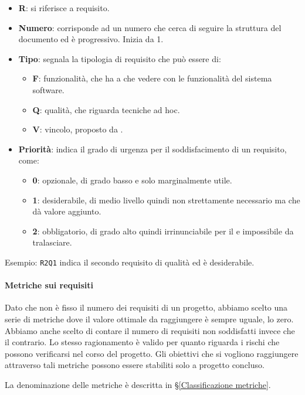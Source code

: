 		\begin{itemize}
			\item \textbf{R}: si riferisce a requisito.
		 	\item \textbf{Numero}: corrisponde ad un numero che cerca di seguire la struttura del documento ed è progressivo. Inizia da 1.
		 	\item \textbf{Tipo}: segnala la tipologia di requisito che può essere di:
		 	\begin{itemize}
		 		\item \textbf{F}: funzionalità, che ha a che vedere con le funzionalità del sistema software.
		 		\item \textbf{Q}: qualità, che riguarda tecniche ad hoc.
		 		\item \textbf{V}: vincolo, proposto da \II.
		 	\end{itemize}
	 		\item \textbf{Priorità}: indica il grado di urgenza per il soddisfacimento di un requisito, come:
	 		\begin{itemize}
	 			\item \textbf{0}: opzionale, di grado basso e solo marginalmente utile.
	 			\item \textbf{1}: desiderabile, di medio livello quindi non strettamente necessario ma che dà valore aggiunto.
	 			\item \textbf{2}: obbligatorio, di grado alto quindi irrinunciabile per il  e impossibile da tralasciare.
	 		\end{itemize}
		\end{itemize}

		Esempio: \texttt{R2Q1} indica il secondo requisito di qualità ed è desiderabile.


		\paragraph{Metriche sui requisiti}\label{MetricheAdR}
		Dato che non è fisso il numero dei requisiti di un progetto, abbiamo scelto una serie di metriche dove il valore ottimale da raggiungere è sempre uguale, lo zero. Abbiamo anche scelto di contare il numero di requisiti non soddisfatti invece che il contrario. Lo stesso ragionamento è valido per quanto	riguarda i rischi che possono verificarsi nel corso del progetto.
		Gli obiettivi che si vogliono raggiungere attraverso tali metriche possono essere stabiliti solo a progetto concluso.
		
		La denominazione delle metriche è descritta in \S\ref{Classificazione metriche}.
		
